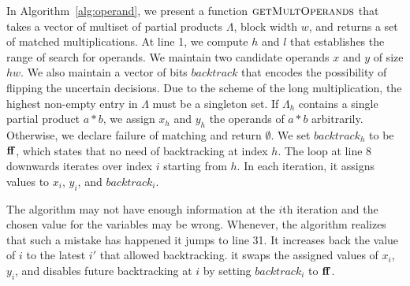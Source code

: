 In Algorithm~\ref{alg:operand}, we present a function
$\textsc{getMultOperands}$ that takes a vector of multiset of partial
products $\Lambda$, block width $w$, and returns a set of matched
multiplications.
%
At line 1, we compute $h$ and $l$ that establishes the range of search for
operands.
%
We maintain two candidate operands $x$ and $y$ of size $hw$.
%
We also maintain a vector of bits $backtrack$ that encodes 
the possibility of flipping the uncertain decisions.
%
Due to the scheme of the long multiplication, the highest
non-empty entry in $\Lambda$ must be a singleton set.
%
If $\Lambda_h$ contains a single partial product $a*b$,
we assign $x_h$ and $y_h$ the operands of $a*b$ arbitrarily.
%
Otherwise, we declare failure of matching and return $\emptyset$.
%
We set $backtrack_h$ to be $\mathbf{ff}$, which states that
no need of backtracking at index $h$.
%
The loop at line 8 downwards iterates over index $i$ starting from $h$.
%
In each iteration, it assigns values to $x_i$, $y_i$, and $backtrack_i$. 
%

The algorithm may not have enough information at
the $i$th iteration and the chosen value for the variables may be wrong.
%
Whenever, the algorithm realizes that such a mistake has happened
it jumps to line 31.
%
It increases back the value of $i$
to the latest $i'$ that allowed backtracking.
%
it swaps the assigned values of $x_i$, $y_i$, and disables future
backtracking at $i$ by setting $backtrack_i$ to
$\mathbf{ff}$.
%

